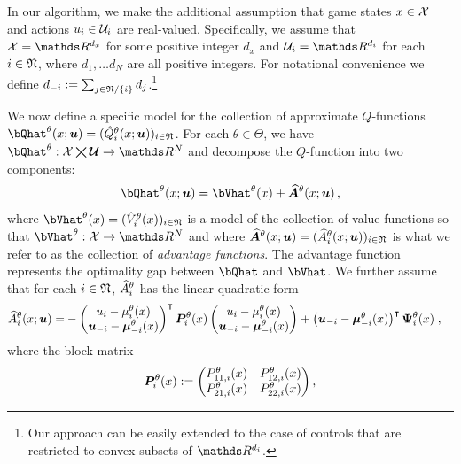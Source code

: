 \documentclass[onefignum,onetabnum]{siamonline171218}
\begin{document}
In our algorithm, we make the additional assumption that game states $x\in\mathcal{X}$ and actions $u_i\in\mathcal{U}_i$ are real-valued. Specifically, we assume that $\X=\R^{d_x}$ for some positive integer $d_x$ and $\Ui=\R^{d_i}$ for each $i\in{\mathfrak{N}}$, where $d_1,\dots d_N$ are all positive integers. For notational convenience we define $d_{-i}:=\sum_{j\in{\mathfrak{N}}/\{i\}} d_j$.\footnote{Our approach  can be easily extended to the case of controls that are restricted to convex subsets of $\R^{d_i}$.}

We now define a specific model for the collection of approximate $Q$-functions $\bQhat^{\theta}(x;\bu) = ( \Qhat^\theta_i(x;\bu) )_{i\in\mfN}$. For each $\theta\in\Theta$, we have $\bQhat^{\theta}:\X\bigtimes\bU \rightarrow \R^N$ and decompose the $Q$-function into two components:
\begin{equation} \label{eq:Q-Function-Decomposition}
	\bQhat^{\theta}(x;\bu) = \bVhat^\theta(x) + \bAhat^\theta (x;\bu)\,,
\end{equation}
where $\bVhat^\theta(x) = ( \Vhat^\theta_i(x) )_{i\in\mfN}$ is a model of the collection of value functions so that $\bVhat^{\theta} : \X \rightarrow \R^N$ and where  $\bm{\widehat{A}}^\theta (x;{\bm{u}}) = ( \widehat{A}_i^\theta (x;{\bm{u}}) )_{i\in{\mathfrak{N}}}$ is what we refer to as the collection of \textit{advantage functions}. The advantage function represents the optimality gap between $\bQhat$ and $\bVhat$. We  further assume that for each $i\in{\mathfrak{N}}$, $\widehat{A}^\theta_i$ has the linear quadratic form
\begin{equation}\label{eq:LQ-Advantage}
\begin{aligned}
	{\Ahat}_{i}^{\theta} (x;\bu) =
	&-
	\begin{pmatrix}
		u_i - \mu^\theta_i(x) \\
		\bu_{-i} - \bmu^\theta_{-i}(x)
	\end{pmatrix}^{\intercal} \bP_i^\theta(x)
	\begin{pmatrix}
		u_i - \mu^\theta_i(x) \\
		\bu_{-i} - \bmu^\theta_{-i}(x)
	\end{pmatrix}
	+
	\begin{pmatrix}
		\bu_{-i} - \bmu^\theta_{-i}(x)
	\end{pmatrix}^\intercal
	\bPsi_i^{\theta}(x)
	\;,
\end{aligned}
\end{equation}
where the block matrix
\begin{equation}
	\bP_i^{\theta}(x) := \begin{pmatrix}
		P_{11,i}^\theta(x) & P_{12,i}^\theta(x) \\ P_{21,i}^\theta(x) & P_{22,i}^\theta(x)
	\end{pmatrix},
\label{eqn:PblockDef}
\end{equation}
\end{document}
